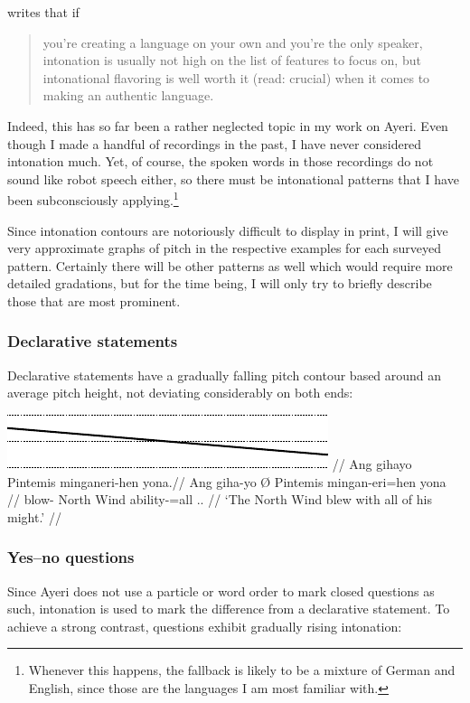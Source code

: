 \citet[66]{peterson2015} writes that if \blockquote{you're creating a language 
on your own and you're the only speaker, intonation is usually not high on the 
list of features to focus on, but intonational flavoring is well worth it 
(read: crucial) when it comes to making an authentic language.} Indeed, this 
has so far been a rather neglected topic in my work on Ayeri. Even though I 
made a handful of recordings in the past, I have never considered intonation 
much. Yet, of course, the spoken words in those recordings do not sound like 
robot speech either, so there must be intonational patterns that I have been 
subconsciously applying.\footnote{Whenever this happens, the fallback is 
likely to be a mixture of German and English, since those are the languages I 
am most familiar with.}

Since intonation contours are notoriously difficult to display in print, I will 
give very approximate graphs of pitch in the respective examples for each 
surveyed pattern. Certainly there will be other patterns as well which would 
require more detailed gradations, but for the time being, I will only try to 
briefly describe those that are most prominent.

\subsubsection{Declarative statements}

Declarative statements have a gradually falling pitch contour based 
around an average pitch height, not deviating considerably on both ends:

\ex[belowexskip=0em]\begingl
	\glpreamble \raisebox{-1.5em}
		{\includegraphics{images/contours-statement.pdf}} //
	\gla Ang gihayo {} Pintemis minganeri-hen yona.//
	\glb Ang giha-yo Ø Pintemis mingan-eri=hen yona //
	\glc \AgtT{} blow-\TsgN{} \Top{} {North Wind} ability-\Ins{}=all
		\TsgN{}.\Gen{}. //
	\glft `The North Wind blew with all of his might.' //
\endgl\xe

\subsubsection{Yes–no questions}

Since Ayeri does not use a particle or word order to mark closed questions as 
such, intonation is used to mark the difference from a declarative statement. 
To achieve a strong contrast, questions exhibit gradually rising intonation:

